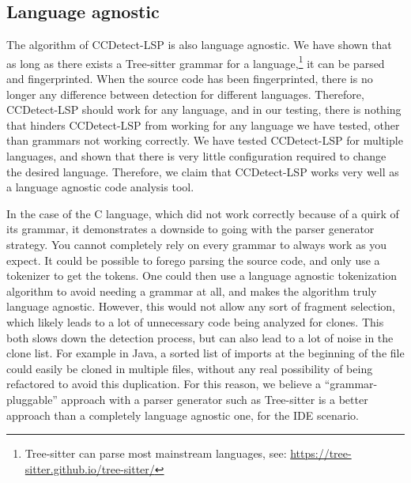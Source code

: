 \subsection*{Language agnostic}

The algorithm of CCDetect-LSP is also language agnostic. We have shown that as long as
there exists a Tree-sitter grammar for a language,\footnote{Tree-sitter can parse most
mainstream languages, see: \url{https://tree-sitter.github.io/tree-sitter/}} it can be
parsed and fingerprinted. When the source code has been fingerprinted, there is no longer
any difference between detection for different languages. Therefore, CCDetect-LSP should
work for any language, and in our testing, there is nothing that hinders CCDetect-LSP from
working for any language we have tested, other than grammars not working correctly. We
have tested CCDetect-LSP for multiple languages, and shown that there is very little
configuration required to change the desired language. Therefore, we claim that
CCDetect-LSP works very well as a language agnostic code analysis tool.

In the case of the C language, which did not work correctly because of a quirk of its
grammar, it demonstrates a downside to going with the parser generator strategy. You
cannot completely rely on every grammar to always work as you expect. It could be possible
to forego parsing the source code, and only use a tokenizer to get the tokens. One could
then use a language agnostic tokenization algorithm to avoid needing a grammar at all, and
makes the algorithm truly language agnostic. However, this would not allow any sort of
fragment selection, which likely leads to a lot of unnecessary code being analyzed for
clones. This both slows down the detection process, but can also lead to a lot of noise in
the clone list. For example in Java, a sorted list of imports at the beginning of the file
could easily be cloned in multiple files, without any real possibility of being refactored
to avoid this duplication. For this reason, we believe a ``grammar-pluggable'' approach
with a parser generator such as Tree-sitter is a better approach than a completely
language agnostic one, for the IDE scenario.
